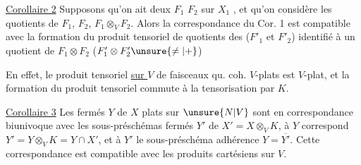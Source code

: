 \uline{Corollaire 2} Supposons qu'on ait deux
$F_1$  $F_2$  sur $X_1$ , et qu'on considère les
 quotients de $F_1$, $F_2$, $F_1\otimes_V F_2$. Alors
la correspondance du Cor. 1 est compatible
avec la formation du  produit tensoriel
de quotients des  ($F'_1$ et $F'_2$)
identifié à un quotient de $F_1\otimes F_2$ ($F'_1\otimes F'_2\unsure{\neq|{+}}$)

En effet, le produit tensoriel \uline{sur $V$}
de faisceaux qu. coh. $V$-plats est $V$-plat,
et la  formation du produit tensoriel
commute à la tensorisation par $K$.

\uline{Corollaire 3}  Les 
fermés $Y$ de $X$ plats sur $\unsure{N|V}$ sont en
correspondance biunivoque avec les
sous-préschémas fermés $Y'$ de $X'=X\otimes_V K$,
à $Y$ correspond $Y'=Y\otimes_V K=Y\cap X'$, et
à $Y'$  le sous-préschéma
adhérence $Y=\overline{Y'}$. Cette correspondance
est compatible avec les produits
cartésiens sur $V$.

